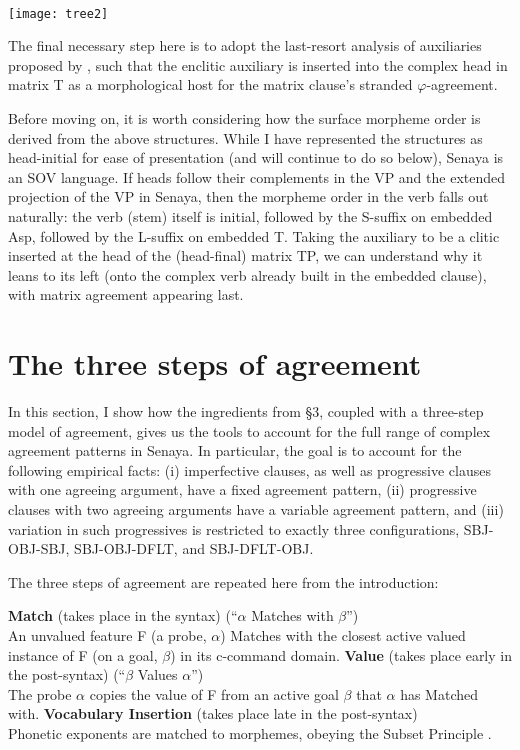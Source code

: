 \documentclass[output=paper
,modfonts
,nonflat]{langsci/langscibook}
\begin{document}
\ea \label{tree2} \- \\ \texttt{[image: tree2]}
\z

\noindent The final necessary step here is to adopt the last-resort analysis of auxiliaries proposed by \citet{Bjorkman11}, such that the enclitic auxiliary is inserted into the complex head in matrix T as a morphological host for the matrix clause's stranded $\varphi$-agreement.

Before moving on, it is worth considering how the surface morpheme order is derived from the above structures. While I have represented the structures as head-initial for ease of presentation (and will continue to do so below), Senaya is an SOV language. If heads follow their complements in the VP and the extended projection of the VP in Senaya, then the morpheme order in the verb falls out naturally:  the verb (stem) itself is initial, followed by the S-suffix on embedded Asp, followed by the L-suffix on embedded T. Taking the auxiliary to be a clitic inserted at the head of the (head-final) matrix TP, we can understand why it leans to its left (onto the complex verb already built in the embedded clause), with matrix agreement appearing last.

\section{The three steps of agreement}

In this section, I show how the ingredients from \S3, coupled with  a three-step model of agreement, gives us the tools to account for the full range of complex agreement patterns in Senaya. In particular, the goal is to account for the following empirical facts: (i) imperfective clauses, as well as progressive clauses with one agreeing argument, have a fixed agreement pattern, (ii) progressive clauses with two agreeing arguments have a variable agreement pattern, and (iii) variation in such progressives is restricted to exactly three configurations, SBJ-OBJ-SBJ, SBJ-OBJ-DFLT, and SBJ-DFLT-OBJ. 

The three steps of agreement are repeated here from the introduction:

\eal \label{OPS2}
\ex \textbf{Match} {(takes place in the syntax)} \- \hfill (``{$\alpha$} Matches with {$\beta$}'')\\
An unvalued feature F (a probe, {$\alpha$}) Matches with the closest active valued instance of F (on a goal, {$\beta$}) in its c-command domain.
\ex \textbf{Value} (takes place early in the post-syntax) \- \hfill (``{$\beta$} Values {$\alpha$}'')\\
The probe {$\alpha$} copies the value of F from an active goal {$\beta$} that {$\alpha$} has Matched with.
\ex \textbf{Vocabulary Insertion} (takes place late in the post-syntax)\\
Phonetic exponents are matched to morphemes, obeying the Subset Principle \citep{Halle97}.
\zl
\end{document}
